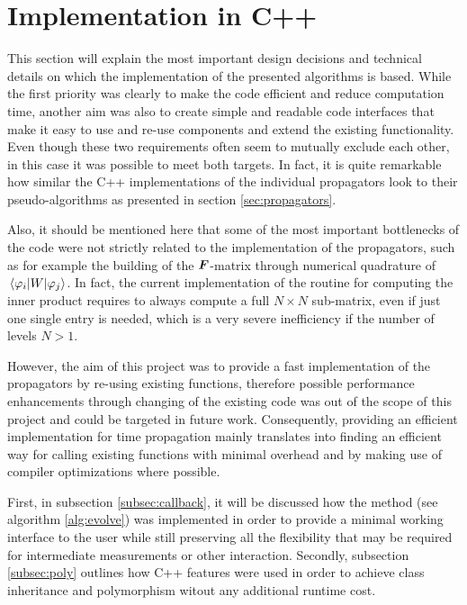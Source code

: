 \section{Implementation in C++}
%
This section will explain the most important design decisions and technical details on which the implementation of the presented algorithms is based.
While the first priority was clearly to make the code efficient and reduce computation time, another aim was also to create simple and readable code interfaces that make it easy to use and re-use components and extend the existing functionality. \\
%
Even though these two requirements often seem to mutually exclude each other, in this case it was possible to meet both targets.
In fact, it is quite remarkable how similar the C++ implementations of the individual propagators look to their pseudo-algorithms as presented in section \ref{sec:propagators}.
\par\medskip
%
Also, it should be mentioned here that some of the most important bottlenecks of the code were not strictly related to the implementation of the propagators, such as for example the building of the $\bm{F}$-matrix through numerical quadrature of $\matrixel{\varphi_i}{W}{\varphi_j}$.
In fact, the current implementation of the  routine for computing the inner product requires to always compute a full $N \times N$ sub-matrix, even if just one single entry is needed, which is a very severe inefficiency if the number of levels $N>1$.
\par\medskip
%
However, the aim of this project was to provide a fast implementation of the propagators by re-using existing functions, therefore possible performance enhancements through changing of the existing code was out of the scope of this project and could be targeted in future work.
Consequently, providing an efficient implementation for time propagation mainly translates into finding an efficient way for calling existing functions with minimal overhead and by making use of compiler optimizations where possible.
\par\medskip
%
First, in subsection \ref{subsec:callback}, it will be discussed how the  method (see algorithm \ref{alg:evolve}) was implemented in order to provide a minimal working interface to the user while still preserving all the flexibility that may be required for intermediate measurements or other interaction.
Secondly, subsection \ref{subsec:poly} outlines how C++ features were used in order to achieve class inheritance and polymorphism witout any additional runtime cost.
